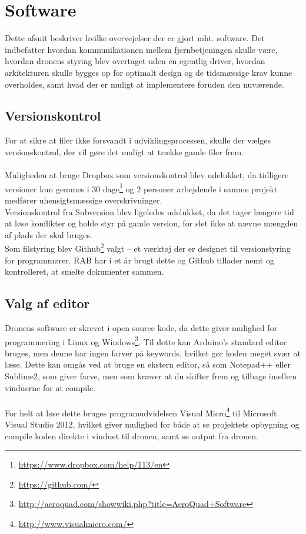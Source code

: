 \documentclass[Main]{subfiles}
\begin{document}
\chapter{Software}
Dette afsnit beskriver hvilke overvejelser der er gjort mht. software.
Det indbefatter hvordan kommunikationen mellem fjernbetjeningen skulle være, hvordan dronens styring blev overtaget uden en egentlig driver, hvordan arkitekturen skulle bygges op for optimalt design og de tidsmæssige krav kunne overholdes, samt hvad der er muligt at implementere foruden den nuværende.



\section{Versionskontrol}
For at sikre at filer ikke forsvandt i udviklingsprocessen, skulle der vælges  versionskontrol, der vil gøre det muligt at trække gamle filer frem.
\\
\\
Muligheden at bruge Dropbox som versionskontrol blev udelukket, da tidligere versioner kun gemmes i 30 dage\footnote{\url{https://www.dropbox.com/help/113/en}} og 2 personer arbejdende i samme projekt medfører uhensigtsmæssige overskrivninger.
\\
Versionskontrol fra Subversion blev ligeledes udelukket, da det tager længere tid at løse konflikter og holde styr på gamle version, for slet ikke at nævne mængden af plads der skal bruges.
\\
Som filstyring blev Github\footnote{\url{https://github.com/}} valgt -- et værktøj der er designet til versionstyring for programmører. RAB har i et år brugt dette og Github tillader nemt og kontrolleret, at smelte dokumenter sammen.





\section{Valg af editor}
Dronens software er skrevet i open source kode, da dette giver mulighed for programmering i Linux og Windows\footnote{\url{http://aeroquad.com/showwiki.php?title=AeroQuad+Software}}.
Til dette kan Arduino's standard editor bruges, men denne har ingen farver på keywords, hvilket gør koden meget svær at læse.
Dette kan omgås ved at bruge en ekstern editor, så som Notepad++ eller Sublime2, som giver farve, men som kræver at du skifter frem og tilbage imellem vinduerne for at compile.
\\
\\
For helt at løse dette bruges programudvidelsen Visual Micro\footnote{\url{http://www.visualmicro.com/}} til Microsoft Visual Studio 2012, hvilket giver mulighed for både at se projektets opbygning og compile koden direkte i vinduet til dronen, samt se output fra dronen.
\end{document}
